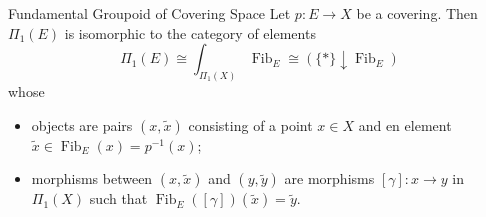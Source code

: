\documentclass{report}
\begin{document}
\begin{proposition}{Fundamental Groupoid of Covering Space}{}
	Let $p:E \to X$ be a covering. Then $\Pi_1(E)$ is isomorphic to the category of elements
	$$
		\Pi_1(E) \cong \int_{\Pi_1(X)} \operatorname{Fib}_E\cong  \left(\{*\} \downarrow \operatorname{Fib}_E\right)
	$$
	whose
	\begin{itemize}
		\item objects are pairs $(x, \widetilde{x})$ consisting of a point $x \in X$ and en element $\widetilde{x} \in \operatorname{Fib}_E(x)=p^{-1}(x)$;
		\item morphisms between $(x, \widetilde{x})$ and $\left(y, \widetilde{y}\right)$ are morphisms $[\gamma]: x \rightarrow y$ in $\Pi_1(X)$ such that $\operatorname{Fib}_E([\gamma])(\widetilde{x})=\widetilde{y}$.
	\end{itemize}
\end{proposition}
\end{document}

